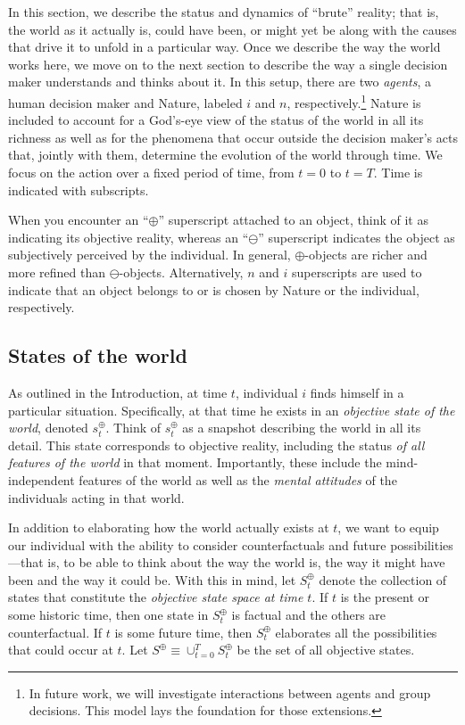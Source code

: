 \documentclass[
11pt,
titlepage,
reqno,
]{article}%
\theoremstyle{definition}
\begin{document}
	In this section, we describe the status and dynamics of ``brute'' reality; that is, the world as it actually is, could have been, or might yet be along with the causes that drive it to unfold in a particular way. 
	Once we describe the way the world works here, we move on to the next section to describe the way a single decision maker understands and thinks about it.
	In this setup, there are two \textit{agents}, a human decision maker and Nature, labeled $i$ and $n$, respectively.\footnote
	{
		In future work, we will investigate interactions between agents and group decisions.
		This model lays the foundation for those extensions.
	} 
	Nature is included to account for  a God's-eye view of the status of the world in all its richness as well as for the phenomena that occur outside the decision maker's acts that, jointly with them, determine the evolution of the world through time.
	We focus on the action over a fixed period of time, from $t=0$ to $t=T$. 
	Time is indicated with subscripts.
	
	When you encounter an ``$\oplus$'' superscript attached to an object, think of it as indicating its objective reality, whereas an ``$\ominus$'' superscript indicates the object as subjectively perceived by the individual.
	In general, $\oplus$-objects are richer and more refined than $\ominus$-objects. 
	Alternatively, $n$ and $i$ superscripts are used to indicate that an object belongs to or is chosen by Nature or the individual, respectively.
	
	
	
	
	\subsection{States of the world\label{sec:states}}
	
	As outlined in the Introduction, at time $t$, individual $i$ finds himself in a particular situation.
	Specifically, at that time he exists in an \textit{objective state of the world}, denoted $s^\oplus_t$.
	Think of $s^\oplus_t$ as a snapshot describing the world in all its detail.
	This state corresponds to objective reality, including the status \textit{of all features of the world} in that moment. 
	Importantly, these include the  mind-independent features of the world as well as the \textit{mental attitudes} of the individuals acting in that world. 
	
	In addition to elaborating how the world actually exists at $t$, we want to equip our individual with the ability to consider counterfactuals and future possibilities---that is, to be able to think about the way the world is, the way it might have been and the way it could be.
	With this in mind, let $S^\oplus_t$ denote the collection of states that constitute the \textit{objective state space at time $t$}. 
	If $t$ is the present or some historic time, then one state in  $S^\oplus_t$ is factual and the others are counterfactual. 
	If $t$ is some future time, then $S^\oplus_t$ elaborates all the possibilities that could occur at $t$.
	Let $S^\oplus\equiv\cup_{t=0}^T S^\oplus_t$ be the set of all objective states.
	
\end{document}

